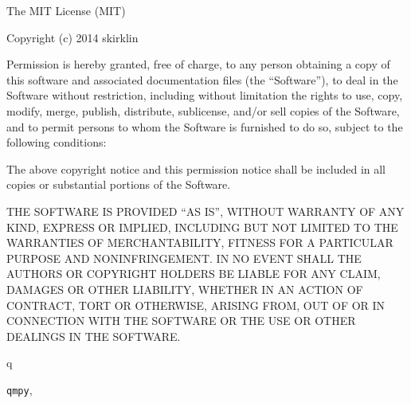 \documentclass[letterpaper,10pt,english]{sphinxmanual}
\begin{document}
The MIT License (MIT)

Copyright (c) 2014 skirklin

Permission is hereby granted, free of charge, to any person obtaining a copy
of this software and associated documentation files (the ``Software''), to deal
in the Software without restriction, including without limitation the rights
to use, copy, modify, merge, publish, distribute, sublicense, and/or sell
copies of the Software, and to permit persons to whom the Software is
furnished to do so, subject to the following conditions:

The above copyright notice and this permission notice shall be included in all
copies or substantial portions of the Software.

THE SOFTWARE IS PROVIDED ``AS IS'', WITHOUT WARRANTY OF ANY KIND, EXPRESS OR
IMPLIED, INCLUDING BUT NOT LIMITED TO THE WARRANTIES OF MERCHANTABILITY,
FITNESS FOR A PARTICULAR PURPOSE AND NONINFRINGEMENT. IN NO EVENT SHALL THE
AUTHORS OR COPYRIGHT HOLDERS BE LIABLE FOR ANY CLAIM, DAMAGES OR OTHER
LIABILITY, WHETHER IN AN ACTION OF CONTRACT, TORT OR OTHERWISE, ARISING FROM,
OUT OF OR IN CONNECTION WITH THE SOFTWARE OR THE USE OR OTHER DEALINGS IN THE
SOFTWARE.


\renewcommand{\indexname}{Python Module Index}
\begin{theindex}
\def\bigletter#1{{\Large\sffamily#1}\nopagebreak\vspace{1mm}}
\bigletter{q}
\item {\texttt{qmpy}}, \pageref{models:module-qmpy}
\end{theindex}

\renewcommand{\indexname}{Index}
\printindex
\end{document}
